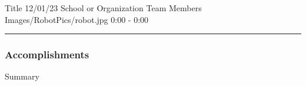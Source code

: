 \insertmeeting
	{Title} 
	{12/01/23} 
	{School or Organization}
	{Team Members}
	{Images/RobotPics/robot.jpg}
	{0:00 - 0:00}

 


\noindent\hfil\rule{\textwidth}{.4pt}\hfil

\subsubsection*{Accomplishments}
Summary


    
